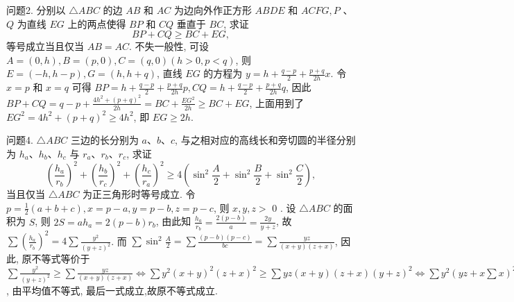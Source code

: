 
问题2. 分别以 $\triangle A B C$ 的边 $A B$ 和 $A C$ 为边向外作正方形 $A B D E$ 和 $A C F G, P$ 、 $Q$ 为直线 $E G$ 上的两点使得 $B P$ 和 $C Q$ 垂直于 $B C$, 求证
$$
B P+C Q \geqslant B C+E G,
$$
等号成立当且仅当 $A B=A C$.
不失一般性, 可设 $A=(0, h), B=(p, 0), C=(q, 0)(h>0, p<q)$, 则 $E=(-h, h-p), G=(h, h+q)$, 直线 $E G$ 的方程为 $y=h+\frac{q-p}{2}+\frac{p+q}{2 h} x$. 令 $x=p$ 和 $x=q$ 可得 $B P=h+\frac{q-p}{2}+\frac{p+q}{2 h} p, C Q=h+\frac{q-p}{2}+\frac{p+q}{2 h} q$, 因此 $B P+C Q=q-p+\frac{4 h^2+(p+q)^2}{2 h}=B C+\frac{E G^2}{2 h} \geqslant B C+E G$, 上面用到了 $E G^2=4 h^2+(p+q)^2 \geqslant 4 h^2$, 即 $E G \geqslant 2 h$.



问题4. $\triangle A B C$ 三边的长分别为 $a 、 b 、 c$, 与之相对应的高线长和旁切圆的半径分别为 $h_a 、 h_b 、 h_c$ 与 $r_a 、 r_b 、 r_c$, 求证
$$
\left(\frac{h_a}{r_b}\right)^2+\left(\frac{h_b}{r_c}\right)^2+\left(\frac{h_c}{r_a}\right)^2 \geqslant 4\left(\sin ^2 \frac{A}{2}+\sin ^2 \frac{B}{2}+\sin ^2 \frac{C}{2}\right),
$$
当且仅当 $\triangle A B C$ 为正三角形时等号成立.
令 $p=\frac{1}{2}(a+b+c), x=p-a, y=p-b, z=p-c$, 则 $x, y, z>$ 0 . 设 $\triangle A B C$ 的面积为 $S$, 则 $2 S=a h_a=2(p-b) r_b$, 由此知 $\frac{h_a}{r_b}=\frac{2(p-b)}{a}= \frac{2 y}{y+z}$, 故 $\sum\left(\frac{h_a}{r_b}\right)^2=4 \sum \frac{y^2}{(y+z)^2}$. 而 $\sum \sin ^2 \frac{A}{2}=\sum \frac{(p-b)(p-c)}{b c}= \sum \frac{y z}{(x+y)(z+x)}$, 因此, 原不等式等价于 $\sum \frac{y^2}{(y+z)^2} \geqslant \sum \frac{y z}{(x+y)(z+x)} \Leftrightarrow \sum y^2(x+y)^2(z+x)^2 \geqslant \sum y z(x+y)(z+x)(y+ z)^2 \Leftrightarrow \sum y^2\left(y z+x \sum x\right)^2 \geqslant \sum y z\left(y z+x \sum x\right)(y+z)^2 \Leftrightarrow \sum y^2 x^2\left(\sum x\right)^2+ \sum y^4 z^2+2 x y z \sum x \sum y^2 \geqslant \sum y^2 z^2(y+z)^2+x y z \sum(y+ z)^2 \sum x \Leftrightarrow \sum y^2 z^2\left(x^2+2 x y+2 x z\right)+\sum y^4 z^2 \geqslant 2 x y z \sum x \cdot \sum x y= 6 x^2 y^2 z^2+2 x y z\left(\sum x^2(y+z)\right) \Leftrightarrow 3 x^2 y^2 z^2+2 x y z \sum x^2(y+z) \leqslant 2 x y z \sum y z(y+z)+\sum y^4 z^2 \Leftrightarrow 3 x^2 y^2 z^2 \leqslant \sum y^4 z^2$, 由平均值不等式, 最后一式成立,故原不等式成立.



